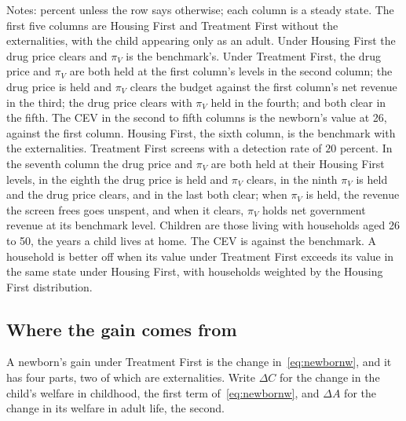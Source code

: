 \documentclass[10pt]{article}
\newcommand{\notes}[2]{\par\vspace{0.4em}%
  \begin{minipage}{#1}\footnotesize #2\end{minipage}}
\newcommand{\tabnote}[1]{\notes{\wd\ntbox}{#1}}
\begin{document}
\begin{table}[!tb]\centering
\caption{The long run under each policy}\label{tab:longrun}
\begingroup\scriptsize\setlength{\tabcolsep}{3pt}
\sbox{\ntbox}{}\usebox{\ntbox}
\tabnote{Notes: percent unless the row says otherwise; each column is a steady state. The first five columns are Housing First and Treatment First without the externalities, with the child appearing only as an adult. Under Housing First the drug price clears and $\pi_V$ is the benchmark's. Under Treatment First, the drug price and $\pi_V$ are both held at the first column's levels in the second column; the drug price is held and $\pi_V$ clears the budget against the first column's net revenue in the third; the drug price clears with $\pi_V$ held in the fourth; and both clear in the fifth. The CEV in the second to fifth columns is the newborn's value at 26, against the first column.
Housing First, the sixth column, is the benchmark with the externalities. Treatment First screens with a detection rate of
$20$ percent. In the seventh column the drug price and $\pi_V$ are both held at their Housing First levels, in the eighth the drug price is held and $\pi_V$ clears, in the ninth $\pi_V$ is held and the drug price clears, and in the last both clear; when $\pi_V$ is held, the revenue the screen frees goes unspent, and when it clears, $\pi_V$ holds net government revenue at its benchmark level. Children are those living with households aged 26 to 50, the years a child lives at
home. The CEV is against the benchmark. A household is better off when its value under Treatment First exceeds
its value in the same state under Housing First, with households weighted by the Housing First distribution.}
\endgroup
\end{table}

\subsection{Where the gain comes from}\label{sec:parts}

A newborn's gain under Treatment First is the change in~\eqref{eq:newbornw}, and it has four parts, two of which are externalities. Write $\Delta C$ for the change in the child's welfare in childhood, the first term of~\eqref{eq:newbornw}, and $\Delta A$ for the change in its welfare in adult life, the second.
\end{document}
